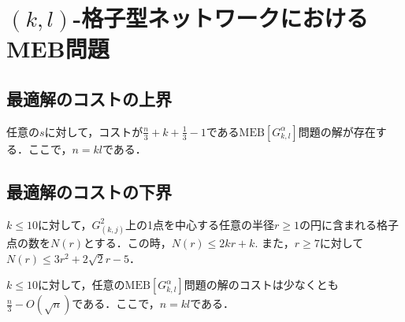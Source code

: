 \documentclass{classes/resume}
\begin{document}
\section{$(k,l)$-格子型ネットワークにおけるMEB問題}
\subsection{最適解のコストの上界}

\begin{theorem}
    任意の$s$に対して，コストが$\frac{n}{3} + k + \frac{1}{3} - 1$である$\mathrm{MEB}[G_{k,l}^{\alpha}]$問題の解が存在する．ここで，$n = kl$である．
\end{theorem}

\subsection{最適解のコストの下界}
\begin{lemma}
    $k \leq 10$に対して，$G_{(k,j)}^2$上の1点を中心する任意の半径$r \geq 1$の円に含まれる格子点の数を$N(r)$とする．この時，$N(r) \leq 2kr + k$. また，$r \ge 7$に対して$N(r) \leq 3r^2 + 2\sqrt{2}r - 5$．
\end{lemma}

\begin{theorem}
    $k \leq 10$に対して，任意の$\mathrm{MEB}[G_{k,l}^{\alpha}]$問題の解のコストは少なくとも$\frac{n}{3} - O(\sqrt{n})$である．ここで，$n = kl$である．
\end{theorem}

\nocite{*}
\printbibliography[title=参考文献]
\end{document}
